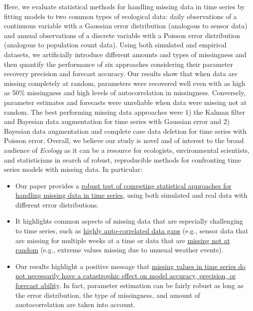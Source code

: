\documentclass{article}
\begin{document}
Here, we evaluate statistical methods for handling missing data in time series by fitting models to two common types of ecological data: daily observations of a continuous variable with a Gaussian error distribution (analogous to sensor data) and annual observations of a discrete variable with a Poisson error distribution (analogous to population count data). Using both simulated and empirical datasets, we artificially introduce different amounts and types of missingness and then quantify the performance of six approaches considering their parameter recovery precision and forecast accuracy. Our results show that when data are missing completely at random, parameters were recovered well even with as high as 50\% missingness and high levels of autocorrelation in missingness. Conversely, parameter estimates and forecasts were unreliable when data were missing not at random. The best performing missing data approaches were 1) the Kalman filter and Bayesian data augmentation for time series with Gaussian error and 2) Bayesian data augmentation and complete case data deletion for time series with Poisson error. Overall, we believe our study is novel and of interest to the broad audience of \textit{Ecology} as it can be a resource for ecologists, environmental scientists, and statisticians in search of robust, reproducible methods for confronting time series models with missing data. In particular:

\vspace{-0.75em}

\begin{itemize} 

\item {Our paper provides a \ul{robust test of competing statistical approaches for handling missing data in time series}, using both simulated and real data with different error distributions.} 

\item {It highlights common aspects of missing data that are especially challenging to time series, such as \ul{highly auto-correlated data gaps} (e.g., sensor data that are missing for multiple weeks at a time or data that are \ul{missing not at random} (e.g., extreme values missing due to unusual weather events).} 

\item {Our results highlight a positive message that \ul{missing values in time series do not necessarily have a catastrophic effect on model accuracy, precision, or forecast ability}. In fact, parameter estimation can be fairly robust as long as the error distribution, the type of missingness, and amount of auotocorrelation are taken into account.} 

\end{itemize}
\end{document}
